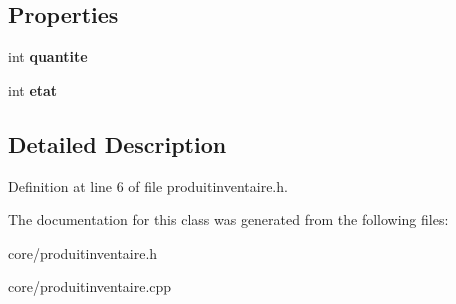 \subsection*{Properties}
\begin{DoxyCompactItemize}
\item 
\hypertarget{class_produit_inventaire_a5493338d9b5bd8b91816e27f76e0c807}{
int {\bfseries quantite}}
\label{class_produit_inventaire_a5493338d9b5bd8b91816e27f76e0c807}

\item 
\hypertarget{class_produit_inventaire_a74e0b82286dd0ae874f7199a09a59e36}{
int {\bfseries etat}}
\label{class_produit_inventaire_a74e0b82286dd0ae874f7199a09a59e36}

\end{DoxyCompactItemize}


\subsection{Detailed Description}


Definition at line 6 of file produitinventaire.h.



The documentation for this class was generated from the following files:\begin{DoxyCompactItemize}
\item 
core/produitinventaire.h\item 
core/produitinventaire.cpp\end{DoxyCompactItemize}

